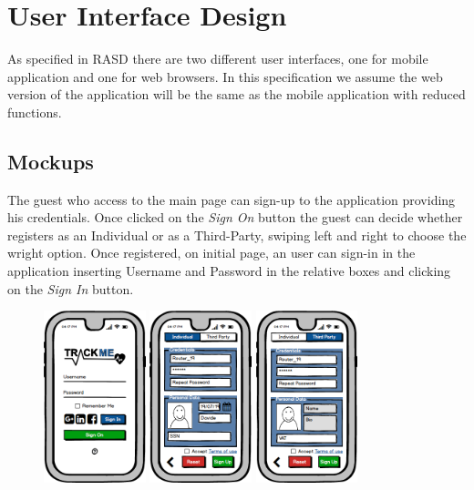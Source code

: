 \documentclass[a4paper]{article}
\begin{document}
\newpage
\section{User Interface Design}
As specified in RASD there are two different user interfaces, one for mobile application and one for web browsers. In this specification we assume the web version of the application will be the same as the mobile application with reduced functions.

\subsection{Mockups}
The guest who access to the main page can sign-up to the application providing his credentials. Once clicked on the \textit{Sign On} button the guest can decide whether registers as an Individual or as a Third-Party, swiping left and right to choose the wright option. Once registered, on initial page, an user can sign-in in the application inserting Username and Password in the relative boxes and clicking on the \textit{Sign In} button. 

\begin{figure}[!htpb]
    	\centering
    	\includegraphics[height=50mm]{images/mockups/Login_Registration.png}
    	\includegraphics[height=50mm]{images/mockups/RegistrationForm.png}
    	\includegraphics[height=50mm]{images/mockups/ThirdPartyRegistration.png}
        \end{figure}
\end{document}
